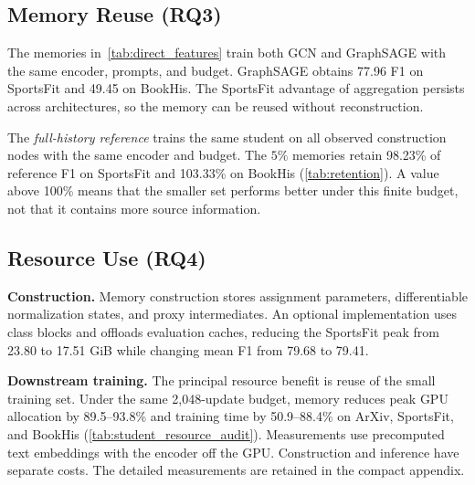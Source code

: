 \subsection{Memory Reuse (RQ3)}
\label{sec:student_transfer}

The memories in~\autoref{tab:direct_features} train both GCN and GraphSAGE with the same encoder, prompts, and budget. GraphSAGE obtains 77.96 F1 on SportsFit and 49.45 on BookHis. The SportsFit advantage of aggregation persists across architectures, so the memory can be reused without reconstruction.

The \emph{full-history reference} trains the same student on all observed construction nodes with the same encoder and budget. The \(5\%\) memories retain 98.23\% of reference F1 on SportsFit and 103.33\% on BookHis (\autoref{tab:retention}). A value above 100\% means that the smaller set performs better under this finite budget, not that it contains more source information.

\begin{table}[t]
\centering
\caption{Full-history utility on one fixed order. Each entry reports Macro-F1 and retention.}
\label{tab:retention}
\end{table}

\subsection{Resource Use (RQ4)}
\label{sec:update_sensitivity}

\noindent\textbf{Construction.}
Memory construction stores assignment parameters, differentiable normalization states, and proxy intermediates. An optional implementation uses class blocks and offloads evaluation caches, reducing the SportsFit peak from 23.80 to 17.51 GiB while changing mean F1 from 79.68 to 79.41.

\noindent\textbf{Downstream training.}
The principal resource benefit is reuse of the small training set. Under the
same 2,048-update budget, memory reduces peak GPU allocation by 89.5--93.8\%
and training time by 50.9--88.4\% on ArXiv, SportsFit, and BookHis
(\autoref{tab:student_resource_audit}). Measurements use precomputed text
embeddings with the encoder off the GPU. Construction and inference have
separate costs. The detailed measurements are retained in the compact
appendix.
